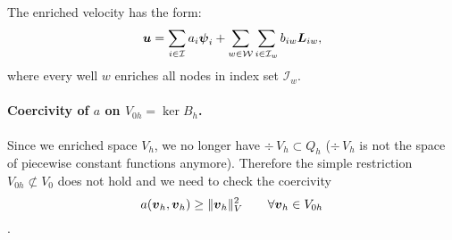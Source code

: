 The enriched velocity has the form:
\[
    \mathbf{\boldsymbol{u}} = 
    \sum \limits_{i\in\mathcal{I}} a_i \mathbf{\boldsymbol{\psi}}_i + 
    \sum \limits_{w\in\mathcal{W}} \sum \limits_{i\in\mathcal{I}_w} b_{iw} \mathbf{\boldsymbol{L}}_{iw},
\]
where every well $w$ enriches all nodes in index set $\mathcal{I}_w$.

\paragraph{Coercivity of $a$ on $V_{0h}=\ker B_h$.}
Since we enriched space $V_h$, we no longer have $\div\,V_{h}\subset Q_h$
($\div\,V_{h}$ is not the space of piecewise constant functions anymore).
Therefore the simple restriction $V_{0h}\not\subset V_0$ does not hold and 
we need to check the coercivity
\[a(\mathbf{\boldsymbol{v}}_h,\mathbf{\boldsymbol{v}}_h)\geq \| \mathbf{\boldsymbol{v}}_h \|^2_V  \qquad \forall \mathbf{\boldsymbol{v}}_h\in V_{0h}\].


